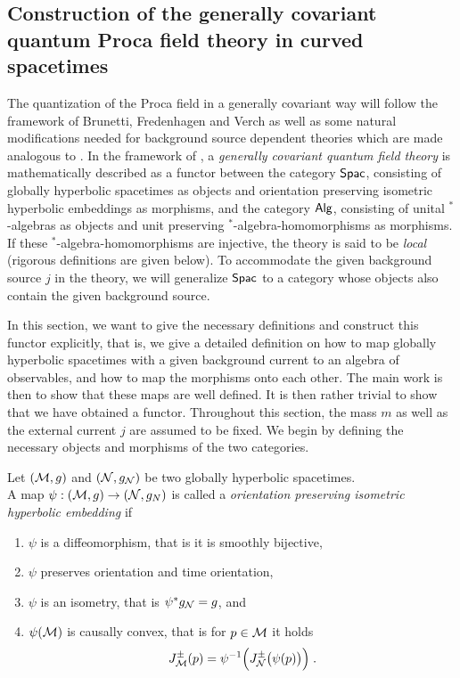 \subsection{Construction of the generally covariant quantum Proca field theory in curved spacetimes}\label{sec:generally_covariant_QFTCS}
The quantization of the Proca field in a generally covariant way will follow the framework of Brunetti, Fredenhagen and Verch \cite{Brunetti_Fredenhagen_Verch} as well as some natural modifications needed for background source dependent theories which are made analogous to \cite{Sanders}. In the framework of \cite{Brunetti_Fredenhagen_Verch}, a \emph{generally covariant quantum field theory} is mathematically described as a functor between the category $\mathsf{Spac}$, consisting of globally hyperbolic spacetimes as objects and orientation preserving isometric hyperbolic embeddings as morphisms, and the category $\mathsf{Alg}$, consisting of unital $^*$-algebras as objects and unit preserving $^*$-algebra-homomorphisms as morphisms. If these $^*$-algebra-homomorphisms are injective, the theory is said to be \emph{local} (rigorous definitions are given below). To accommodate the given background source $j$ in the theory, we will generalize $\mathsf{Spac}$ to a category whose objects also contain the given background source. \par
In this section, we want to give the necessary definitions and construct this functor explicitly, that is, we give a detailed definition on how to map globally hyperbolic spacetimes with a given background current to an algebra of observables, and how to map the morphisms onto each other. The main work is then to show that these maps are well defined. It is then rather trivial to show that we have obtained a functor. Throughout this section, the mass $m$ as well as the external current $j$ are assumed to be fixed.
\newpage
%
%
We begin by defining the necessary objects and morphisms of the two categories.
\begin{definition}
Let $(\mathcal{M},g)$ and $(\mathcal{N},g_{\mathcal{N}})$ be two globally hyperbolic spacetimes. \\
A  map $\psi : (\mathcal{M},g) \to (\mathcal{N},g_N)$ is called a \emph{orientation preserving isometric hyperbolic embedding} if
\begin{enumerate}
\item $\psi$ is a diffeomorphism, that is it is smoothly bijective,
\item $\psi$ preserves orientation and time orientation,
	\item $\psi$ is an isometry, that is $\psi^* g_{\mathcal{N}} = g$, and
	\item $\psi(\mathcal{M})$ is causally convex, that is for $p \in \mathcal{M}$ it holds
\begin{align*}
J_{\mathcal{M}}^\pm(p) = \psi^{-1} \Big( J_{\mathcal{N}}^\pm \big( \psi(p)\big) \Big) \; .
\end{align*}
\end{enumerate}
\end{definition}
